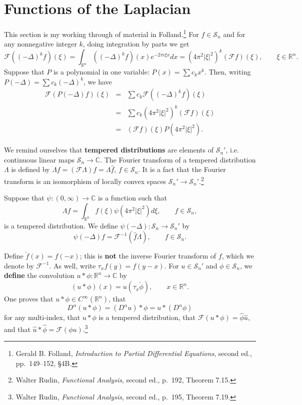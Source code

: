 \documentclass{article}
\begin{document}
\section{Functions of the Laplacian}
This section is my working through of material in Folland.\footnote{Gerald B. Folland, {\em Introduction to Partial
Differential Equations}, second ed., pp.~149--152, \S 4B.}
For $f \in \mathscr{S}_n$ and for any nonnegative integer $k$, doing integration by parts we get
\[
\mathscr{F}((-\Delta)^k f)(\xi) =\int_{\mathbb{R}^n} ((-\Delta)^k f)(x) e^{-2\pi i \xi x} dx= (4\pi^2 |\xi|^2)^k (\mathscr{F}f)(\xi), \qquad \xi \in \mathbb{R}^n.
\]
Suppose that $P$ is a polynomial in one variable: $P(x)=\sum c_k x^k$. Then, writing
$P(-\Delta)=\sum c_k (-\Delta)^k$, we have 
\begin{eqnarray*}
\mathscr{F}(P(-\Delta)f)(\xi)& =& \sum c_k \mathscr{F}((-\Delta)^k f)(\xi)\\
& =& \sum c_k (4\pi^2 |\xi|^2)^k (\mathscr{F} f)(\xi)\\
&=& (\mathscr{F}f)(\xi) P(4\pi^2 |\xi|^2).
\end{eqnarray*}

We remind ourselves that \textbf{tempered distributions} are elements of $\mathscr{S}_n'$, i.e. continuous linear maps $\mathscr{S}_n \to \mathbb{C}$.
The Fourier transform of a tempered distribution $\Lambda$ is defined by $\widehat{\Lambda} f =(\mathscr{F}\Lambda) f= \Lambda \hat{f}$, $f \in \mathscr{S}_n$.
It is a fact that the Fourier transform is an isomorphism of locally convex spaces $\mathscr{S}_n' \to \mathscr{S}_n'$.\footnote{Walter Rudin,
{\em Functional Analysis}, second ed., p.~192, Theorem 7.15.}

Suppose that $\psi:(0,\infty) \to \mathbb{C}$ is a function such that
\[
\Lambda f = \int_{\mathbb{R}^n} f(\xi) \psi(4\pi^2 |\xi|^2) d\xi, \qquad f \in \mathscr{S}_n,
\]
 is a tempered
distribution. We define $\psi(-\Delta):\mathscr{S}_n \to \mathscr{S}_n'$ by
\[
\psi(-\Delta) f = \mathscr{F}^{-1}(\hat{f} \Lambda), \qquad f \in \mathscr{S}_n.
\]

Define $\check{f}(x)=f(-x)$; this is \textbf{not} the inverse Fourier transform of $f$, which we denote by $\mathscr{F}^{-1}$. As well,
write $\tau_x f(y) = f(y-x)$. For $u \in \mathscr{S}_n'$ and $\phi \in \mathscr{S}_n$, we \textbf{define} the convolution $u*\phi:\mathbb{R}^n \to \mathbb{C}$ by
\[
(u*\phi)(x) = u(\tau_x \check{\phi}), \qquad x \in \mathbb{R}^n.
\]
One proves that $u*\phi \in C^\infty(\mathbb{R}^n)$, that
\[
D^\alpha(u*\phi) = (D^\alpha u)*\phi = u*(D^\alpha \phi)
\]
for any multi-index,  that $u*\phi$ is a tempered distribution, that $\mathscr{F}(u*\phi)=\hat{\phi}\hat{u}$, and that
$\hat{u}*\hat{\phi} = \mathscr{F}(\phi u)$.\footnote{Walter Rudin, {\em Functional Analysis}, second ed., p.~195,
Theorem 7.19.}
\end{document}
